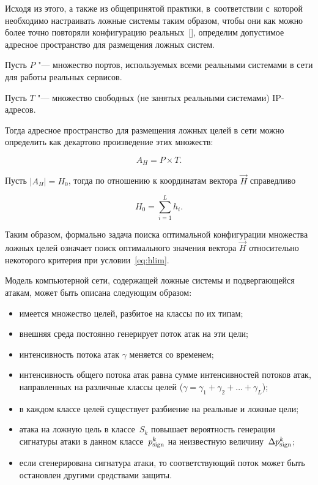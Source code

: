 Исходя из этого, а также из общепринятой практики, в~соответствии с~которой необходимо настраивать ложные системы таким образом, чтобы они как можно более точно повторяли конфигурацию реальных~[], определим допустимое адресное пространство для размещения ложных систем. 

Пусть $P$ "--- множество портов, используемых всеми реальными системами в сети для работы реальных сервисов. 

Пусть $T$ "--- множество свободных (не занятых реальными системами) IP-адресов. 

Тогда адресное пространство для размещения ложных целей в сети можно определить как декартово произведение этих множеств: 

$$

A_H = P \times T.

$$



Пусть $|A_H| = H_0$, тогда по отношению к координатам вектора $\vec{H}$ справедливо

\begin{equation}

H_0 = \sum_{i=1}^L h_i. \label{eq:hlim}

\end{equation}



Таким образом, формально задача поиска оптимальной конфигурации множества ложных целей означает поиск оптимального значения вектора $\vec{H}$ относительно некоторого критерия при условии~\eqref{eq:hlim}.



Модель компьютерной сети, содержащей ложные системы и подвергающейся атакам, может быть описана следующим образом:

\begin{itemize}

\item имеется множество целей, разбитое на классы по их типам;

\item внешняя среда постоянно генерирует поток атак на эти цели;

\item интенсивность потока атак $\gamma$ меняется со временем;

\item интенсивность общего потока атак равна сумме интенсивностей потоков атак, направленных на различные классы целей ($\gamma=\gamma_1+\gamma_2+\dots+\gamma_L$);

\item в каждом классе целей существует разбиение на реальные и ложные цели;

\item атака на ложную цель в классе~$S_k$ повышает вероятность генерации сигнатуры атаки в данном классе~$p_{\rm sign}^k$ на неизвестную величину~$\Delta p_{\rm sign}^k$;

\item если сгенерирована сигнатура атаки, то соответствующий поток может быть остановлен другими средствами защиты.

\end{itemize}



